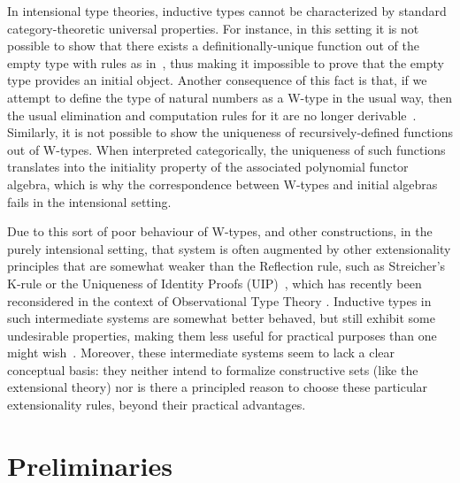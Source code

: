 \documentclass[10pt,a4paper,oneside,reqno]{amsart}
\theoremstyle{mythm}
\theoremstyle{mydef}
\theoremstyle{myrmk}
\begin{document}
In intensional type theories, inductive types cannot be characterized by standard category-theoretic
universal properties. For instance, in this setting it is not possible to show that there exists a 
definitionally-unique function out of the empty type with rules as in~\cite[Section~5.2]{NordstromB:marltt}, thus making it impossible to prove that the empty type provides an initial object. 
Another consequence of this fact is that, if we attempt to define the type of 
natural numbers as a W-type in the usual way, then 
the usual elimination and computation rules for it are no longer derivable~\cite{DybjerP:repids}. Similarly, it is not possible to show the uniqueness of recursively-defined functions out of W-types. When interpreted categorically, the uniqueness of such functions translates into the initiality property of the associated polynomial functor algebra, which is why the correspondence between W-types and initial algebras fails in the intensional setting.

Due to this sort of poor behaviour of W-types, and other constructions, in the purely intensional setting, that system is often augmented by other extensionality principles that are somewhat weaker than the Reflection rule, such as Streicher's K-rule  or the Uniqueness of Identity Proofs (UIP)~\cite{StreicherT:invitt}, which has recently been reconsidered
in the context of Observational Type Theory \cite{AltenkirchT:obsen}.  Inductive types in such intermediate systems are somewhat better behaved, but still exhibit some undesirable properties, making them less useful for practical purposes than one might wish~\cite{McBrideC:wtygnb}.  Moreover, these intermediate systems seem to lack a clear conceptual basis:  they neither intend to formalize constructive sets (like the extensional theory) nor is there a principled reason to choose these particular extensionality rules, beyond their practical advantages.  


\newpage

\section{Preliminaries}
\label{section:prelim}
\end{document}
